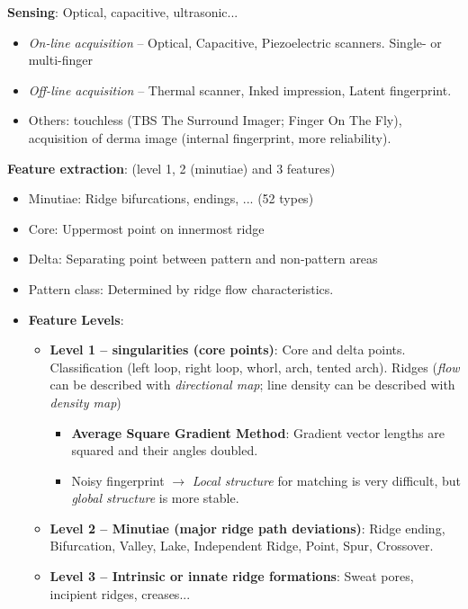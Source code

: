 \documentclass[a4paper]{article}
\begin{document}
      \textbf{Sensing}: Optical, capacitive, ultrasonic...
      \begin{itemize}
        \item \emph{On-line acquisition} -- Optical, Capacitive, Piezoelectric scanners. Single- or multi-finger
        \item \emph{Off-line acquisition} -- Thermal scanner, Inked impression, Latent fingerprint.
        \item Others: touchless (TBS The Surround Imager; Finger On The Fly), acquisition of derma image (internal fingerprint, more reliability).
      \end{itemize}

      \textbf{Feature extraction}: (level 1, 2 (minutiae) and 3 features)
      \begin{itemize}
        \item Minutiae: Ridge bifurcations, endings, ... (52 types)
        \item Core: Uppermost point on innermost ridge
        \item Delta: Separating point between pattern and non-pattern areas
        \item Pattern class: Determined by ridge flow characteristics.
        \item\textbf{Feature Levels}:
        \begin{itemize}
          \item \textbf{Level 1 -- singularities (core points)}: Core and delta points. Classification (left loop, right loop, whorl, arch, tented arch). Ridges (\emph{flow} can be described with \emph{directional map}; line density can be described with \emph{density map})
          \begin{itemize}
            \item \textbf{Average Square Gradient Method}: Gradient vector lengths are squared and their angles doubled.
            \item Noisy fingerprint $\rightarrow$ \emph{Local structure} for matching is very difficult, but \emph{global structure} is more stable.
          \end{itemize}
          \item \textbf{Level 2 -- Minutiae (major ridge path deviations)}: Ridge ending, Bifurcation, Valley, Lake, Independent Ridge, Point, Spur, Crossover.
          \item \textbf{Level 3 -- Intrinsic or innate ridge formations}: Sweat pores, incipient ridges, creases...
        \end{itemize}
      \end{itemize}
\end{document}
